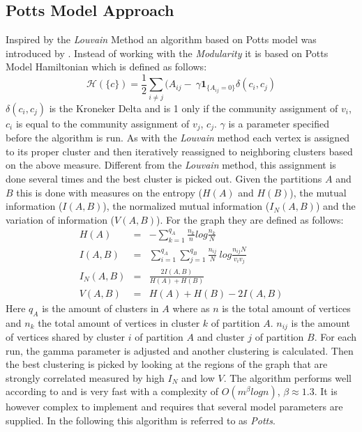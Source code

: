 \subsection{Potts Model Approach}
Inspired by the \emph{Louvain} Method an algorithm based on Potts model 
was introduced by \cite{ronhovde2009}. Instead of working with the 
\emph{Modularity} it is based on Potts Model Hamiltonian which is 
defined as follows:
\begin{equation}
	\mathcal{H}(\{c\}) = \frac{1}{2} \sum_{i \neq j} (A_{ij} - \
	\gamma \mathbf{1}_{\{A_{ij} = 0\}} \delta(c_i, c_j)
\end{equation}
$\delta(c_i, c_j)$ is the Kroneker Delta and is 1 only if the community 
assignment of $v_i$, $c_i$ is equal to the community assignment of 
$v_j$, $c_j$. $\gamma$ is a parameter specified before the algorithm is 
run. As with the \emph{Louvain} method each vertex is assigned to its 
proper cluster and then iteratively reassigned to neighboring clusters 
based on the above measure. Different from the \emph{Louvain} method, 
this assignment is done several times and the best cluster is picked 
out.  Given the partitions $A$ and $B$ this is done with measures on the 
entropy ($H(A)$ and $H(B)$), the mutual information ($I(A,B)$), the 
normalized mutual information ($I_N(A,B)$) and the variation of 
information ($V(A,B)$).  For the graph they are defined as follows:
\begin{eqnarray}
	H(A) & = & - \sum_{k=1}^{q_A} \frac{n_k}{n} log \frac{n_k}{N} \\
	I(A,B) & = & \sum_{i=1}^{q_A} \sum_{j=1}^{q_B} \frac{n_{ij}}{N} \
	log \frac{n_{ij}N}{v_i v_j} \\
	I_N(A,B) & = & \frac{2I(A,B)}{H(A) + H(B)} \\
	V(A,B) & = & H(A) + H(B) - 2I(A,B)
\end{eqnarray}
Here $q_A$ is the amount of clusters in $A$ where as $n$ is the total 
amount of vertices and $n_k$ the total amount of vertices in cluster $k$ 
of partition $A$. $n_{ij}$ is the amount of vertices shared by cluster 
$i$ of partition $A$ and cluster $j$ of partition $B$. For each run, the 
gamma parameter is adjusted and another clustering is calculated. Then 
the best clustering is picked by looking at the regions of the graph 
that are strongly correlated measured by high $I_N$ and low $V$.
The algorithm performs well according to \cite{lancichinetti2009} and is 
very fast with a complexity of $O(m^\beta log n)$, $\beta \approx 1.3$.  
It is however complex to implement and requires that several model 
parameters are supplied. In the following this algorithm is referred to 
as \emph{Potts}.

